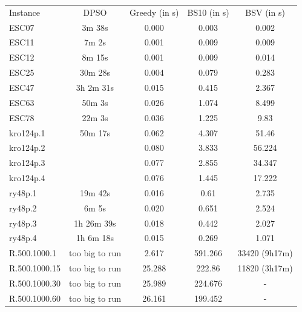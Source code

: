 \documentclass[]{article}
\begin{document}
	\begin{table}[H]
		\begin{tabular}{lcccc}
			Instance      & DPSO           & Greedy (in s) & BS10 (in s) & BSV (in s)    \\
			ESC07         &     3m 38s     & 0.000         & 0.003       & 0.002         \\
			ESC11         &     7m  2s     & 0.001         & 0.009       & 0.009         \\
			ESC12         &     8m 15s     & 0.001         & 0.009       & 0.014         \\
			ESC25         &    30m 28s     & 0.004         & 0.079       & 0.283         \\
			ESC47         & 3h  2m 31s     & 0.015         & 0.415       & 2.367         \\
			ESC63         &    50m  3s     & 0.026         & 1.074       & 8.499         \\
			ESC78         &    22m  3s     & 0.036         & 1.225       & 9.83          \\
			kro124p.1     &    50m 17s     & 0.062         & 4.307       & 51.46         \\
			kro124p.2     &                & 0.080         & 3.833       & 56.224        \\
			kro124p.3     &                & 0.077         & 2.855       & 34.347        \\
			kro124p.4     &                & 0.076         & 1.445       & 17.222        \\
			ry48p.1       &    19m 42s     & 0.016         & 0.61        & 2.735         \\
			ry48p.2       &     6m  5s     & 0.020         & 0.651       & 2.524         \\
			ry48p.3       & 1h 26m 39s     & 0.018         & 0.442       & 2.027         \\
			ry48p.4       & 1h  6m 18s     & 0.015         & 0.269       & 1.071         \\
			R.500.1000.1  & too big to run & 2.617         & 591.266     & 33420 (9h17m) \\
			R.500.1000.15 & too big to run & 25.288        & 222.86      & 11820 (3h17m) \\
			R.500.1000.30 & too big to run & 25.989        & 224.676     & -             \\
			R.500.1000.60 & too big to run & 26.161        & 199.452     & -             \\

\end{tabular}
\end{table}
\end{document}
